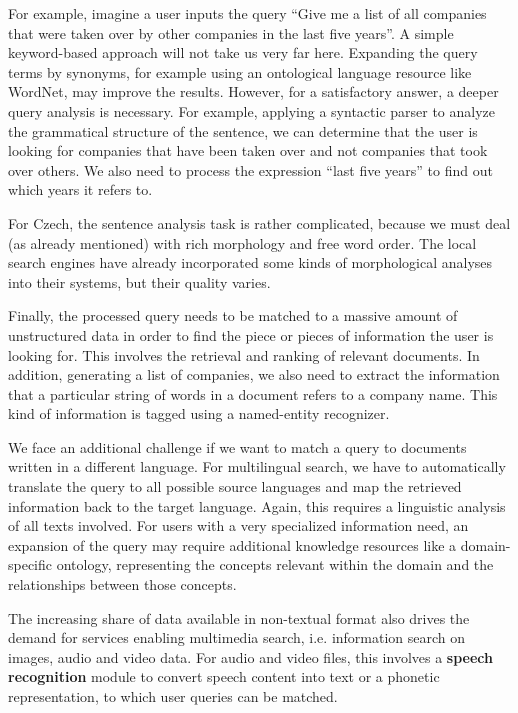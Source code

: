 \documentclass[]{../../metanetpaper}
\begin{document}
\begin{multicols}{2}
For example, imagine a user inputs the query “Give me a list of all companies that were taken over by other companies in the last five years”. A simple keyword-based approach will not take us very far here. Expanding the query terms by synonyms, for example using an ontological language resource like WordNet, may improve the results. However, for a satisfactory answer, a deeper query analysis is necessary. For example, applying a syntactic parser to analyze the grammatical structure of the sentence, we can determine that the user is looking for companies that have been taken over and not companies that took over others. We also need to process the expression “last five years” to find out which years it refers to.

For Czech, the sentence analysis task is rather complicated, because we must deal (as already mentioned) with rich morphology and free word order. The local search engines have already incorporated some kinds of morphological analyses into their systems, but their quality varies.

Finally, the processed query needs to be matched to a massive amount of unstructured data in order to find the piece or pieces of information the user is looking for. This involves the retrieval and ranking of relevant documents. In addition, generating a list of companies, we also need to extract the information that a particular string of words in a document refers to a company name. This kind of information is tagged using a named-entity recognizer.

We face an additional challenge if we want to match a query to documents written in a different language. For multilingual search, we have to automatically translate the query to all possible source languages and map the retrieved information back to the target language. Again, this requires a linguistic analysis of all texts involved. For users with a very specialized information need, an expansion of the query may require additional knowledge resources like a domain-specific ontology, representing the concepts relevant within the domain and the relationships between those concepts.

The increasing share of data available in non-textual format also drives the demand for services enabling multimedia search, i.e. information search on images, audio and video data. For audio and video files, this involves a \textbf{speech recognition} module to convert speech content into text or a phonetic representation, to which user queries can be matched.  
  

\end{multicols}
\end{document}
